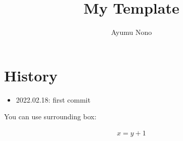 \documentclass[dvipdfmx,autodetect-engine]{article}
\title{My Template}
\author{Ayumu Nono}
\begin{document}
\maketitle

\section{History}
\begin{itemize}
    \item 2022.02.18: first commit
\end{itemize}
You can use surrounding box:
\begin{tcolorbox}
\begin{align}
    x = y + 1
\end{align}
\end{tcolorbox}
\end{document}
